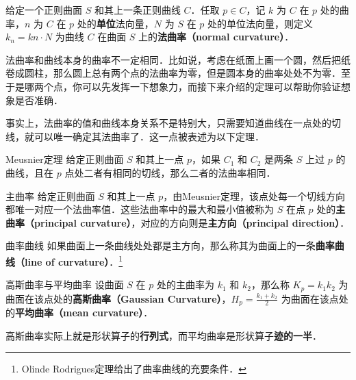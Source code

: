 




\begin{definition}{}
给定一个正则曲面 $S$ 和其上一条正则曲线 $C$．任取 $p\in C$，记 $k$ 为 $C$ 在 $p$ 处的曲率，$n$ 为 $C$ 在 $p$ 处的\textbf{单位}法向量，$N$ 为 $S$ 在 $p$ 处的单位法向量，则定义 $k_n=kn\cdot N$ 为曲线 $C$ 在曲面 $S$ 上的\textbf{法曲率（normal curvature）}．
\end{definition}

法曲率和曲线本身的曲率不一定相同．比如说，考虑在纸面上画一个圆，然后把纸卷成圆柱，那么圆上总有两个点的法曲率为零，但是圆本身的曲率处处不为零．至于是哪两个点，你可以先发挥一下想象力，而接下来介绍的定理可以帮助你验证想象是否准确．

事实上，法曲率的值和曲线本身关系不是特别大，只需要知道曲线在一点处的切线，就可以唯一确定其法曲率了．这一点被表述为以下定理．

\begin{theorem}{Meusnier定理}
给定正则曲面 $S$ 和其上一点 $p$，如果 $C_1$ 和 $C_2$ 是两条 $S$ 上过 $p$ 的曲线，且在 $p$ 点处二者有相同的切线，那么二者的法曲率相同．
\end{theorem}

\begin{definition}{主曲率}
给定正则曲面 $S$ 和其上一点 $p$，由Meusnier定理，该点处每一个切线方向都唯一对应一个法曲率值．这些法曲率中的最大和最小值被称为 $S$ 在点 $p$ 处的\textbf{主曲率（principal curvature）}，对应的方向则是\textbf{主方向（principal direction）}．
\end{definition}

\begin{definition}{曲率曲线}
如果曲面上一条曲线处处都是主方向，那么称其为曲面上的一条\textbf{曲率曲线（line of curvature）}．\footnote{Olinde Rodrigues定理给出了曲率曲线的充要条件．}
\end{definition}

\begin{definition}{高斯曲率与平均曲率}
设曲面 $S$ 在 $p$ 处的主曲率为 $k_1$ 和 $k_2$，那么称 $K_p=k_1k_2$ 为曲面在该点处的\textbf{高斯曲率（Gaussian Curvature）}，$H_p=\frac{k_1+k_2}{2}$ 为曲面在该点处的\textbf{平均曲率（mean curvature）}．
\end{definition}

高斯曲率实际上就是形状算子的\textbf{行列式}，而平均曲率是形状算子\textbf{迹的一半}．

